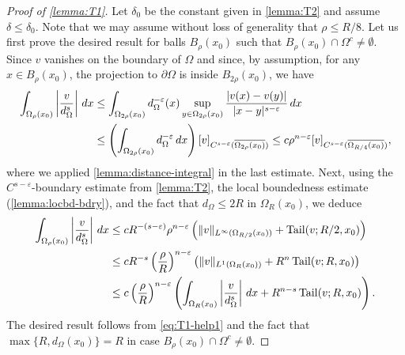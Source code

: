 \documentclass[11pt,reqno]{amsart}
\theoremstyle{plain}
\theoremstyle{definition}
\numberwithin{equation}{section}
\newcommand{\eps}{\varepsilon}
\newcommand{\1}{\mathbbm{1}}
\DeclareMathOperator{\tail}{Tail}
\renewcommand{\d}{\textnormal{\,d}}
\begin{document}
\begin{proof}[Proof of \autoref{lemma:T1}]
Let $\delta_0$ be the constant given in \autoref{lemma:T2} and assume $\delta \leq \delta_0$.
Note that we may assume without loss of generality that $\rho \le R/8$.
Let us first prove the desired result for balls $B_{\rho}(x_0)$ such that $B_{\rho}(x_0) \cap \Omega^c \not=\emptyset$.
Since $v$ vanishes on the boundary of $\Omega$ and since, by assumption, for any $x \in B_{\rho}(x_0)$, the projection to $\partial \Omega$ is inside $B_{2\rho}(x_0)$, we have
\begin{align*}
\int_{\Omega_{\rho}(x_0)} \left|\frac{v}{d_{\Omega}^s} \right| \d x 
&\le \int_{\Omega_{2\rho}(x_0)} d_{\Omega}^{-\eps}(x) \sup_{y \in \Omega_{2\rho}(x_0)}\frac{|v(x) - v(y)|}{|x-y|^{s-\eps}} \d x \\
&\le \left( \int_{\Omega_{2\rho}(x_0)} d_{\Omega}^{-\eps} \d x \right) [v]_{C^{s-\eps}(\overline{\Omega_{2\rho}(x_0)})} \le
c \rho^{n-\eps} [ v ]_{C^{s-\eps}(\overline{\Omega_{R/4}(x_0)})},
\end{align*}
where we applied \autoref{lemma:distance-integral} in the last estimate. Next, using the $C^{s-\eps}$-boundary estimate from \autoref{lemma:T2}, the local boundedness estimate (\autoref{lemma:locbd-bdry}), and the fact that $d_{\Omega} \le 2R$ in $\Omega_{R}(x_0)$, we deduce
\begin{align}
\label{eq:T1-help1}
\begin{split}
\int_{\Omega_{\rho}(x_0)} \left|\frac{v}{d_{\Omega}^s} \right| \d x
&\le c R^{-(s-\varepsilon)} \rho^{n-\eps} \left( \Vert v \Vert_{L^{\infty}(\Omega_{R/2}(x_0))} + \tail(v; R/2,x_0) \right)\\
&\le c R^{-s} \left( \frac{\rho}{R} \right)^{n-\eps} \left( \|v\|_{L^1(\Omega_R(x_0))} + R^n \tail(v; R, x_0) \right)\\
&\le c \left( \frac{\rho}{R} \right)^{n-\eps} \left(\int_{\Omega_{R}(x_0)} \left| \frac{v}{d_{\Omega}^s} \right| \d x + R^{n-s} \tail(v ; R, x_0) \right).
\end{split}
\end{align}
The desired result follows from \eqref{eq:T1-help1} and the fact that $\max\{R, d_\Omega(x_0)\}=R$ in case $B_\rho(x_0) \cap \Omega^c \neq \emptyset$.




\end{proof}
\end{document}
